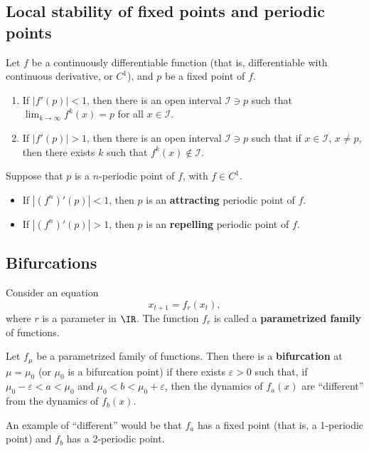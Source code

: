 \subsection{Local stability of fixed points and periodic points}
\begin{theorem}
Let $f$ be a continuously differentiable function (that is, differentiable with continuous derivative, or $C^1$), and $p$ be a fixed point of $f$. 
\begin{enumerate}
\item If $|f'(p)|<1$, then there is an open interval $\mathcal{I}\ni p$ such that $\lim_{k\to\infty}f^k(x)=p$ for all $x\in\mathcal{I}$.
\item If $|f'(p)|>1$, then there is an open interval $\mathcal{I}\ni p$ such that if $x\in\mathcal{I}$, $x\neq p$, then there exists $k$ such that $f^k(x)\not\in\mathcal{I}$.
\end{enumerate}
\end{theorem}
\begin{definition}
Suppose that $p$ is a $n$-periodic point of $f$, with $f\in C^1$. 
\begin{itemize}
\item If $|\left(f^n\right)'(p)|<1$, then $p$ is an \textbf{attracting} periodic point of $f$. 
\item If $|\left(f^n\right)'(p)|>1$, then $p$ is an \textbf{repelling} periodic point of $f$.
\end{itemize}
\end{definition}

\subsection{Bifurcations}
Consider an equation 
\begin{equation}
x_{t+1}=f_r(x_t),
\end{equation}
where $r$ is a parameter in $\IR$.
The function $f_r$ is called a \textbf{parametrized family} of functions.


\begin{definition}[Bifurcation]
Let $f_\mu$ be a parametrized family of functions. Then there is a \textbf{bifurcation} at $\mu=\mu_0$ (or $\mu_0$ is a bifurcation point) if there exists $\varepsilon>0$ such that, if $\mu_0-\varepsilon<a<\mu_0$ and $\mu_0<b<\mu_0+\varepsilon$, then the dynamics of $f_a(x)$ are ``different'' from the dynamics of $f_b(x)$.
\end{definition}
\vskip0.5cm
An example of ``different'' would be that $f_a$ has a fixed point (that is, a 1-periodic point) and $f_b$ has a 2-periodic point.


